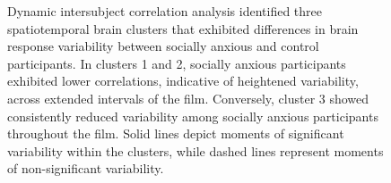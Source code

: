 \begin{figure}[!ht]
	\centering
	\caption{Dynamic intersubject correlation analysis identified three spatiotemporal brain clusters that exhibited differences in brain response variability between socially anxious and control participants. In clusters 1 and 2, socially anxious participants exhibited lower correlations, indicative of heightened variability, across extended intervals of the film. Conversely, cluster 3 showed consistently reduced variability among socially anxious participants throughout the film. Solid lines depict moments of significant variability within the clusters, while dashed lines represent moments of non-significant variability.}
    \vspace*{-10pt}
	\label{fig:isc-fmri-time-sa}
\end{figure}


